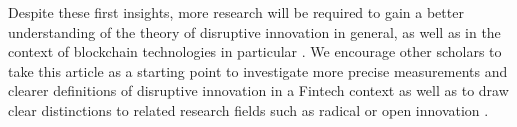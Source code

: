 Despite these first insights, more research will be required to gain a better understanding 
of the theory of disruptive innovation in general, as well as in the context of 
blockchain technologies in particular \parencite[cf.]{ISI:000222662900002}. We encourage other 
scholars to take this article as a starting point to investigate more precise measurements 
\parencite[cf.]{JPIM:JPIM176} and clearer definitions \parencite{JPIM:JPIM177} 
of disruptive innovation in a Fintech context as well as to draw clear distinctions 
to related research fields such as radical or open innovation \parencite[cf.]{ISI:000283729100005}. 

